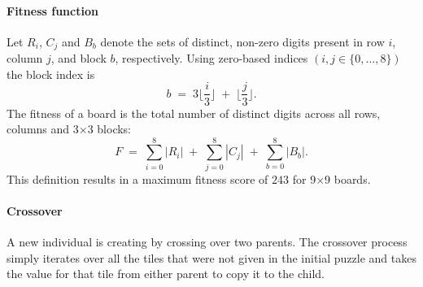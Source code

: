 \paragraph{Fitness function}\label{par:ff-impl1} Let $R_i$, $C_j$ and $B_b$ denote the sets of distinct, non-zero digits present in row $i$, column $j$, and block $b$, respectively. Using zero-based indices $(i,j\in\{0,\dots,8\})$ the block index is
\[
b \;=\; 3\Big\lfloor\frac{i}{3}\Big\rfloor \;+\; \Big\lfloor\frac{j}{3}\Big\rfloor .
\]
The fitness of a board is the total number of distinct digits across all rows, columns and 3\(\times\)3 blocks:
\[
F \;=\; \sum_{i=0}^{8} |R_i| \;+\; \sum_{j=0}^{8} |C_j| \;+\; \sum_{b=0}^{8} |B_b|.
\]
This definition results in a maximum fitness score of $243$ for 9$\times$9 boards.

\paragraph{Crossover} A new individual is creating by crossing over two parents. The crossover process simply iterates over all the tiles that were not given in the initial puzzle and takes the value for that tile from either parent to copy it to the child.

